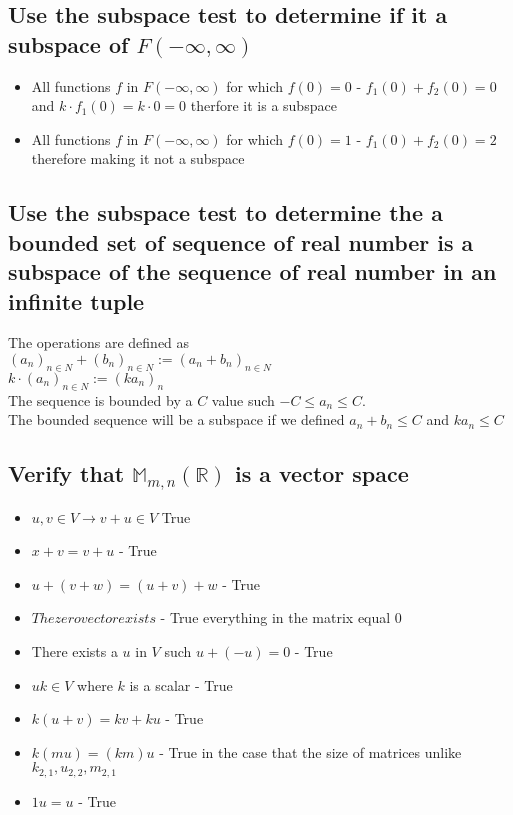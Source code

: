\documentclass[12pt, a4paper]{article}
\begin{document}
		\subsection{Use the subspace test to determine if it a subspace of $F(-\infty,\infty)$}
			\begin{itemize}
				\item All functions $f$ in $F(-\infty,\infty)$ for which $f(0)=0$ - $f_1(0)+f_2(0)=0$ and $k\cdot f_1(0)=k\cdot 0=0$ therfore it is a subspace
				\item All functions $f$ in $F(-\infty,\infty)$ for which $f(0)=1$ - $f_1(0)+f_2(0)=2$ therefore making it not a subspace
			\end{itemize}
		\subsection{Use the subspace test to determine the a bounded set of sequence of real number is a subspace of the sequence of real number in an infinite tuple}
			The operations are defined as\\
			$(a_n)_{n\in N}+(b_n)_{n\in N}:=(a_n+b_n)_{n\in N}$\\
			$k\cdot (a_n)_{n\in N}:=(ka_n)_{n}$\\
			The sequence is bounded by a $C$ value such $-C\leq a_n \leq C$.\\
			The bounded sequence will be a subspace if we defined $a_n+b_n\leq C$ and $ka_n\leq C$
		\subsection{Verify that $\mathbb{M}_{m,n}(\mathbb{R})$ is a vector space}
				\begin{itemize}
					\item $u,v\in V \rightarrow v+u\in V$ True
					\item $x+v=v+u$ - True
					\item $u+(v+w)=(u+v)+w$ - True
					\item $The zero vector exists$ - True everything in the matrix equal 0
					\item There exists a $u$ in $V$ such $u+(-u)=0$ - True
					\item $uk\in V$ where $k$ is a scalar - True
					\item $k(u+v)=kv+ku$ - True
					\item $k(mu)=(km)u$ - True in the case that the size of matrices unlike $k_{2,1},u_{2,2},m_{2,1}$
					\item $1u=u$ - True
				\end{itemize}
\end{document}
